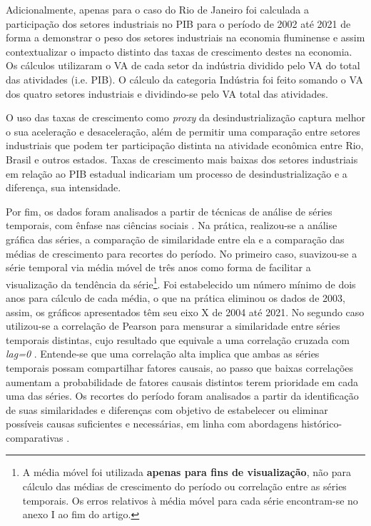 
Adicionalmente, apenas para o caso do Rio de Janeiro foi calculada a
participação dos setores industriais no PIB para o período de 2002 até
2021 de forma a demonstrar o peso dos setores industriais na economia
fluminense e assim contextualizar o impacto distinto das taxas de
crescimento destes na economia. Os cálculos utilizaram o VA de cada
setor da indústria dividido pelo VA do total das atividades (i.e. PIB).
O cálculo da categoria Indústria foi feito somando o VA dos quatro
setores industriais e dividindo-se pelo VA total das atividades.



O uso das taxas de crescimento como \emph{proxy} da desindustrialização
captura melhor o sua aceleração e desaceleração, além de permitir uma
comparação entre setores industriais que podem ter participação distinta
na atividade econômica entre Rio, Brasil e outros estados. Taxas de
crescimento mais baixas dos setores industriais em relação ao PIB
estadual indicariam um processo de desindustrialização e a diferença,
sua intensidade.

Por fim, os dados foram analisados a partir de técnicas de análise de
séries temporais, com ênfase nas ciências sociais
\citep{shin_time_2017}. Na
prática, realizou-se a análise gráfica das séries, a comparação de
similaridade entre ela e a comparação das médias de crescimento para
recortes do período. No primeiro caso, suavizou-se a série temporal via
média móvel de três anos como forma de facilitar a visualização da
tendência da série\footnote{A média móvel foi utilizada \textbf{apenas
  para fins de visualização}, não para cálculo das médias de crescimento
  do período ou correlação entre as séries temporais. Os erros relativos
  à média móvel para cada série encontram-se no anexo I ao fim do
  artigo.}. Foi estabelecido um número mínimo de dois anos para cálculo
de cada média, o que na prática eliminou os dados de 2003, assim, os
gráficos apresentados têm seu eixo X de 2004 até 2021. No segundo caso
utilizou-se a correlação de Pearson para mensurar a similaridade entre
séries temporais distintas, cujo resultado que equivale a uma correlação
cruzada com \emph{lag=0}
\citep{shin_time_2017}.
Entende-se que uma correlação alta implica que ambas as séries temporais
possam compartilhar fatores causais, ao passo que baixas correlações
aumentam a probabilidade de fatores causais distintos terem prioridade
em cada uma das séries. Os recortes do período foram analisados a partir
da identificação de suas similaridades e diferenças com objetivo de
estabelecer ou eliminar possíveis causas suficientes e necessárias, em
linha com abordagens histórico-comparativas
\citep{mahoney_comparative-historical_2004}.

